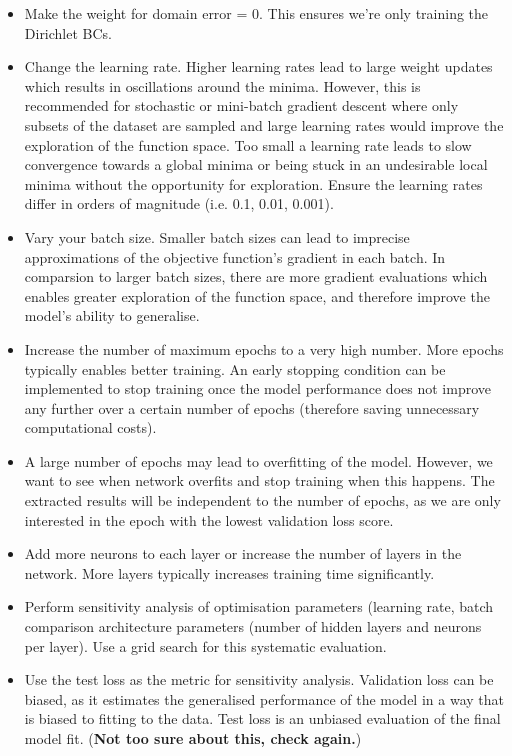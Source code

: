 \documentclass[11pt]{article}
\begin{document}
\begin{itemize}
    \item Make the weight for domain error = 0. This ensures we're only training the Dirichlet BCs. 
    \item Change the learning rate. Higher learning rates lead to large weight updates which results in oscillations around the minima. However, this is recommended for stochastic or mini-batch gradient descent where only subsets of the dataset are sampled and large learning rates would improve the exploration of the function space. Too small a learning rate leads to slow convergence towards a global minima or being stuck in an undesirable local minima without the opportunity for exploration. Ensure the learning rates differ in orders of magnitude (i.e. 0.1, 0.01, 0.001).
    \item Vary your batch size. Smaller batch sizes can lead to imprecise approximations of the objective function's gradient in each batch. In comparsion to larger batch sizes, there are more gradient evaluations which enables greater exploration of the function space, and therefore improve the model's ability to generalise.
    \item Increase the number of maximum epochs to a very high number. More epochs typically enables better training. An early stopping condition can be implemented to stop training once the model performance does not improve any further over a certain number of epochs (therefore saving unnecessary computational costs). 
    \item A large number of epochs may lead to overfitting of the model. However, we want to see when network overfits and stop training when this happens. The extracted results will be independent to the number of epochs, as we are only interested in the epoch with the lowest validation loss score. 
    \item Add more neurons to each layer or increase the number of layers in the network. More layers typically increases training time significantly.  
    \item Perform sensitivity analysis of optimisation parameters (learning rate, batch comparison architecture parameters (number of hidden layers and neurons per layer). Use a grid search for this systematic evaluation.
    \item Use the test loss as the metric for sensitivity analysis. Validation loss can be biased, as it estimates the generalised performance of the model in a way that is biased to fitting to the data. Test loss is an unbiased evaluation of the final model fit. (\textbf{Not too sure about this, check again.})\\   
\end{itemize}
\end{document}
